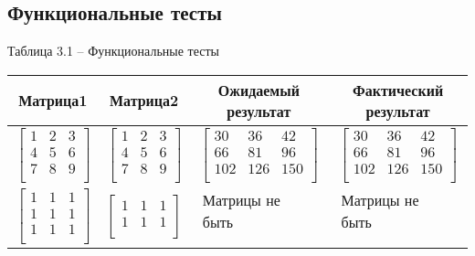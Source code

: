 \newpage
\subsection{Функциональные тесты}
	\begin{center}
	      Таблица 3.1 -- Функциональные тесты
	\end{center}
\begin{table}[H]
\label{tabular:functional_test}
 \begin{center}
\begin{tabular}{ | c | c | c | c |}
			\hline
			\textbf{Матрица1} & \textbf{Матрица2} & \multicolumn{1}{|p{3cm}|}{\textbf{Ожидаемый результат}} & \multicolumn{1}{|p{3cm}|}{\textbf{Фактический результат}}\\ \hline
			$\begin{bmatrix} 
   			1&2&3 \\
    			4&5&6 \\ 
   			7&8&9 \\ 
			\end{bmatrix}$ & 
			$\begin{bmatrix} 
   			1&2&3 \\
    			4&5&6 \\ 
   			7&8&9 \\ 
			\end{bmatrix}$ &
			$\begin{bmatrix} 
   			30&36&42 \\
    			66&81&96 \\ 
   			102&126&150 \\ 
			\end{bmatrix} $ &
			$\begin{bmatrix} 
   			30&36&42 \\
    			66&81&96 \\ 
   			102&126&150 \\ 
			\end{bmatrix} $\\
			\hline

			
			$\begin{bmatrix} 
   			1&1&1 \\
    			1&1&1 \\ 
   			1&1&1 \\ 
			\end{bmatrix}$ & 
			$\begin{bmatrix} 
   			1&1&1 \\
    			1&1&1 \\ 
			\end{bmatrix}$ &
			$\begin{matrix} 
   			\text{Матрицы не могут} \\
    			\text{быть перемножены} \\ 
			\end{matrix} $ &
			$\begin{matrix} 
   			\text{Матрицы не могут} \\
    			\text{быть перемножены} \\ 
			\end{matrix} $ \\
			\hline
			

\end{tabular}
\end{center}
\end{table}
